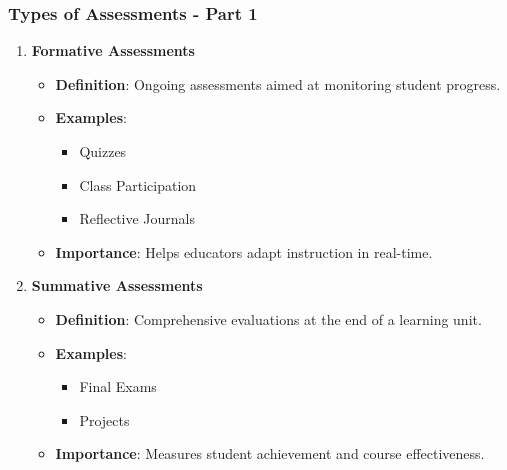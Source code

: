 \documentclass[aspectratio=169]{beamer}
\begin{document}
\begin{frame}[fragile]
    \frametitle{Types of Assessments - Part 1}
    \begin{enumerate}
        \item \textbf{Formative Assessments}
            \begin{itemize}
                \item \textbf{Definition}: Ongoing assessments aimed at monitoring student progress.
                \item \textbf{Examples}:
                    \begin{itemize}
                        \item Quizzes
                        \item Class Participation
                        \item Reflective Journals
                    \end{itemize}
                \item \textbf{Importance}: Helps educators adapt instruction in real-time.
            \end{itemize}

        \item \textbf{Summative Assessments}
            \begin{itemize}
                \item \textbf{Definition}: Comprehensive evaluations at the end of a learning unit.
                \item \textbf{Examples}:
                    \begin{itemize}
                        \item Final Exams
                        \item Projects
                    \end{itemize}
                \item \textbf{Importance}: Measures student achievement and course effectiveness.
            \end{itemize}
    \end{enumerate}
\end{frame}
\end{document}
